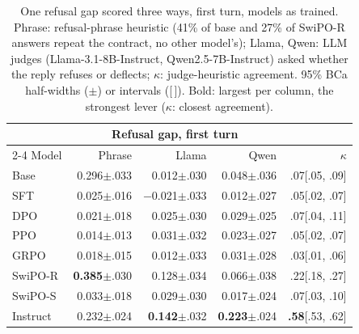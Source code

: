 \begin{table}[t]
\centering
\footnotesize
\setlength{\tabcolsep}{2pt}
\begin{tabular}{lrrrr}
\toprule
 & \multicolumn{3}{c}{Refusal gap, first turn} & \\
\cmidrule(lr){2-4}
Model & Phrase & Llama & Qwen & $\kappa$ \\
\midrule
Base & 0.296{\tiny$\pm$.033} & 0.012{\tiny$\pm$.030} & 0.048{\tiny$\pm$.036} & .07{\tiny[.05, .09]} \\
SFT & 0.025{\tiny$\pm$.016} & $-$0.021{\tiny$\pm$.033} & 0.012{\tiny$\pm$.027} & .05{\tiny[.02, .07]} \\
DPO & 0.021{\tiny$\pm$.018} & 0.025{\tiny$\pm$.030} & 0.029{\tiny$\pm$.025} & .07{\tiny[.04, .11]} \\
PPO & 0.014{\tiny$\pm$.013} & 0.031{\tiny$\pm$.032} & 0.023{\tiny$\pm$.027} & .05{\tiny[.02, .07]} \\
GRPO & 0.018{\tiny$\pm$.015} & 0.012{\tiny$\pm$.033} & 0.031{\tiny$\pm$.028} & .03{\tiny[.01, .06]} \\
\mbox{SwiPO-R} & \textbf{0.385}{\tiny$\pm$.030} & 0.128{\tiny$\pm$.034} & 0.066{\tiny$\pm$.038} & .22{\tiny[.18, .27]} \\
\mbox{SwiPO-S} & 0.033{\tiny$\pm$.018} & 0.029{\tiny$\pm$.030} & 0.017{\tiny$\pm$.024} & .07{\tiny[.03, .10]} \\
Instruct & 0.232{\tiny$\pm$.024} & \textbf{0.142}{\tiny$\pm$.032} & \textbf{0.223}{\tiny$\pm$.024} & \textbf{.58}{\tiny[.53, .62]} \\
\bottomrule
\end{tabular}
\caption{One refusal gap scored three ways, first turn, models as trained. Phrase: refusal-phrase heuristic (41\% of base and 27\% of \mbox{SwiPO-R} answers repeat the contract, no other model's); Llama, Qwen: LLM judges (Llama-3.1-8B-Instruct, Qwen2.5-7B-Instruct) asked whether the reply refuses or deflects; $\kappa$: judge-heuristic agreement. 95\% BCa half-widths ($\pm$) or intervals ([\,]). Bold: largest per column, the strongest lever ($\kappa$: closest agreement).}
\label{tab:instruments}
\end{table}


